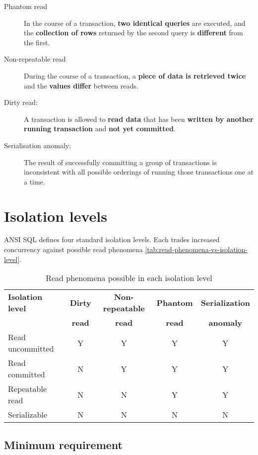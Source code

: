 \documentclass[slides]{pgnotes}
\begin{document}
\begin{description}
\item[Phantom read] In the course of a transaction, \textbf{two identical queries} are executed, and the \textbf{collection of rows} returned by the second query is \textbf{different} from the first.
\item[Non-repeatable read] During the course of a transaction, a \textbf{piece of data is retrieved twice} and the \textbf{values differ} between reads.
\item[Dirty read:] A transaction is allowed to \textbf{read data} that has been \textbf{written by another running transaction} and \textbf{not yet committed}.
\item[Serialisation anomaly:] The result of successfully committing a group of transactions is inconsistent with all possible orderings of running those transactions one at a time.
\end{description}
  
\section{Isolation levels}

ANSI SQL defines four standard isolation levels.
Each trades increased concurrency against possible read phenomena \autoref{tab:read-phenomena-vs-isolation-level}.

\begin{table}[htbp]
  \centering
  \begin{tabular}{l c c c c}
    \toprule
    \textbf{Isolation level} & \textbf{Dirty} & \textbf{Non-repeatable} & \textbf{Phantom} & \textbf{Serialization} \\
    ~ & \textbf{read} & \textbf{read} & \textbf{read} & \textbf{anomaly} \\
    \midrule
    Read uncommitted & Y & Y & Y & Y \\
    Read committed & N & Y & Y & Y \\
    Repeatable read & N & N & Y & Y \\
    Serializable & N & N & N & N \\
    \bottomrule
  \end{tabular}
  \caption{Read phenomena possible in each isolation level}
  \label{tab:read-phenomena-vs-isolation-level}
\end{table}

\subsection{Minimum requirement}
\end{document}
